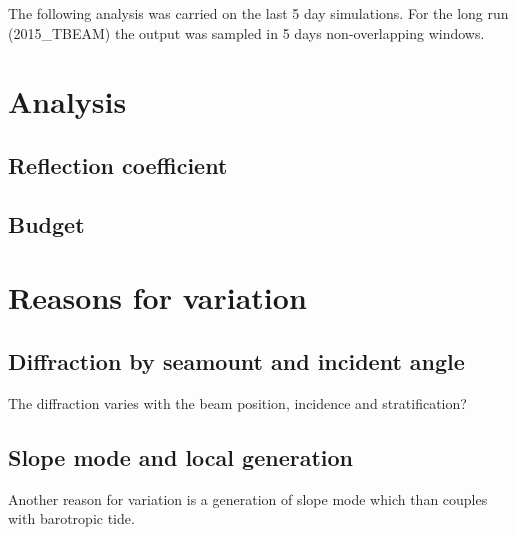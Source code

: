 The following analysis was carried on the last 5 day simulations. For the long run (2015\_TBEAM) the output was sampled in 5 days non-overlapping windows.\\

\section{Analysis}
\subsection{Reflection coefficient}
\begin{figure}
\end{figure}

\subsection{Budget}
\begin{figure}
\end{figure}

\section{Reasons for variation}
\subsection{Diffraction by seamount and incident angle}
The diffraction varies with the beam position, incidence and stratification?
\begin{figure}
\end{figure}

\subsection{Slope mode and local generation}
Another reason for variation is a generation of slope mode which than couples with barotropic tide.
\begin{figure}
\end{figure}
\begin{figure}
\end{figure}

